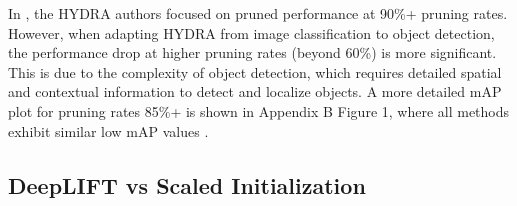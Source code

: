 \documentclass[10pt]{cai}
\begin{document}
In \cite{hydra}, the HYDRA authors focused on pruned performance at 90\%+ pruning rates. However, when adapting HYDRA from image classification to object detection, the performance drop at higher pruning rates (beyond 60\%) is more significant. This is due to the complexity of object detection, which requires detailed spatial and contextual information to detect and localize objects. A more detailed mAP plot for pruning rates 85\%+ is shown in Appendix B Figure 1, where all methods exhibit similar low mAP values \cite{MyAppendix}.

\subsection{DeepLIFT vs Scaled Initialization}
\label{sec1}
\end{document}
